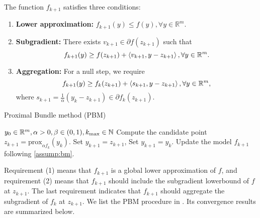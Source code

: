 \documentclass[11pt]{article}
\begin{document}
\begin{assumption}
    \label{assump:bm} 
    The function $f_{k+1}$ satisfies three conditions: 
    
    \vspace{-2mm}
    \begin{enumerate}[leftmargin=*]
    \setlength{\itemsep}{0pt}
        \item \textbf{Lower approximation:} $f_{k+1}(y) \leq f(y), \forall y \in \mathbb{R}^m.$ \vspace{-1pt}
        \item \textbf{Subgradient:} There exists $ v_{k+1} \in \partial f(z_{k+1})$ such that 
        $$f_{k+1}(y) \geq f(z_{k+1}) + \left \langle v_{k+1}, y-z_{k+1} \right\rangle, \forall y \in \mathbb{R}^m.$$ 
        
        \vspace{-8pt}
        
        \item \textbf{Aggregation:} For a null step, we require
        $$f_{k+1}(y) \geq f_k(z_{k+1}) + \left \langle s_{k+1}, y-z_{k+1} \right\rangle,\forall y \in \mathbb{R}^m,$$
        where $s_{k+1} = \frac{1}{\alpha}(y_k - z_{k+1}) \in \partial f_{k}(z_{k+1})$.
    \end{enumerate}
\end{assumption}
\vspace{-6pt}


\begin{algorithm}[t]
\caption{Proximal Bundle method (PBM)}\label{alg:bundle}
\begin{algorithmic}[1]
\Require $y_0 \in \mathbb{R}^m, \alpha > 0, \beta \in (0,1),  k_{\max}\in \mathbb{N}$
    \State Compute the candidate point $z_{k+1} = \mathrm{prox}_{\alpha f_k}(y_k)$.
        \State Set $y_{k+1} = z_{k+1}$, \hfill {}
    \Else
        \State Set $y_{k+1} = y_k$.  \hfill {}
    \EndIf
    \State Update the model $f_{k+1}$ following \cref{assump:bm}.
\EndFor
\end{algorithmic}
\end{algorithm}


Requirement (1) means that $f_{k+1}$ is a global lower approximation of $f$, and requirement (2) means that $f_{k+1}$ should include the subgradient lowerbound of $f$ at $z_{k+1}$. The last requirement indicates that $f_{k+1}$ should aggregate the subgradient of $f_{k}$ at $z_{k+1}$. We list the PBM procedure in . Its convergence results are summarized below.
\end{document}

